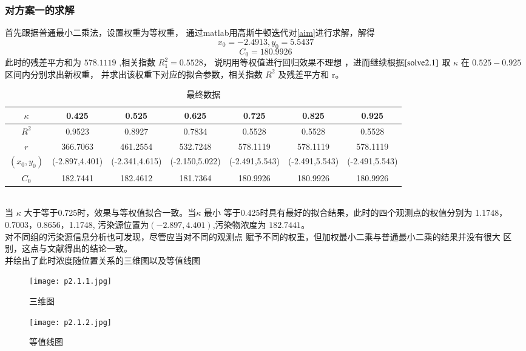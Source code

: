 \documentclass[UTF8]{ctexart}
\begin{document}
  \subsubsection{对方案一的求解}
  首先跟据普通最小二乘法，设置权重为等权重，
     通过matlab用高斯牛顿迭代对\ref{aim}进行求解，解得
     $$ x_0=-2.4913,y_0=5.5437$$
     $$ C_0=180.9926 $$
     此时的残差平方和为 $578.1119$ ,相关指数 $R_1^2=0.5528$，
     说明用等权值进行回归效果不理想 ，进而继续根据$\ref{solve2.1}$
     取 $\kappa$ 在 $0.525-0.925$ 区间内分别求出新权重，
     并求出该权重下对应的拟合参数，相关指数 $R^2$ 及残差平方和 r。
     \begin{table}[htbp]
      \caption{最终数据}
     \begin{tabular}{|c|c|c|c|c|c|c|}
      \hline  $\kappa$ &0.425 & 0.525 &0.625 &0.725 &0.825 &0.925 \\
      \hline  $R^2$    &
      0.9523  &  0.8927  &  0.7834 &   0.5528   & 0.5528  &  0.5528   \\
      \hline  $r$    & 366.7063 & 461.2554 & 532.7248 & 578.1119 & 578.1119 & 578.1119   \\
      \hline  $(x_0,y_0)$ & (-2.897,4.401)   &(-2.341,4.615)  & (-2.150,5.022)  & (-2.491,5.543)  
       &(-2.491,5.543)  & (-2.491,5.543) \\
      \hline  $C_0$ &
      182.7441  & 182.4612 & 181.7364 & 180.9926 & 180.9926 & 180.9926 \\
    \hline
    \end{tabular}
    \end{table}
    \\
    当 $\kappa$ 大于等于0.725时，效果与等权值拟合一致。当$\kappa$ 最小
    等于0.425时具有最好的拟合结果，此时的四个观测点的权值分别为 1.1748， 0.7003，0.8656，1.1748,
    污染源位置为$(-2.897,4.401)$,污染物浓度为 $182.7441$。\\
    对不同组的污染源信息分析也可发现，尽管应当对不同的观测点
    赋予不同的权重，但加权最小二乘与普通最小二乘的结果并没有很大
    区别，这点与文献\cite{key}得出的结论一致。
    \\
     并绘出了此时浓度随位置关系的三维图以及等值线图
     \begin{figure}[htbp]
      
              \centering
              \texttt{[image: p2.1.1.jpg]}
              \caption{三维图}
              \label{pp2.1.1}
       \end{figure}
      
       \begin{figure}
            \centering
            \texttt{[image: p2.1.2.jpg]}
            \caption{等值线图}
            \label{pp2.1.2}
    
          
     \end{figure}
     \newpage
\end{document}
